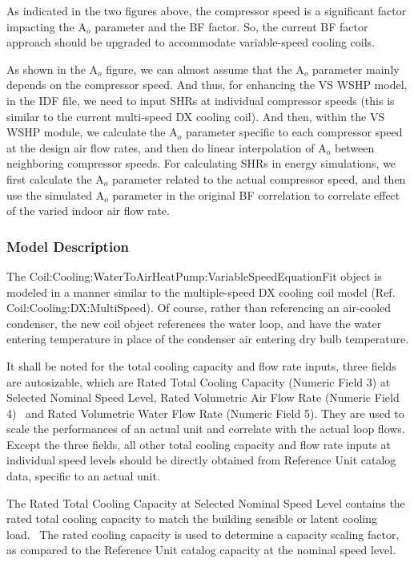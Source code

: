 As indicated in the two figures above, the compressor speed is a significant factor impacting the A\(_{o}\) parameter and the BF factor. So, the current BF factor approach should be upgraded to accommodate variable-speed cooling coils.

As shown in the A\(_{o}\) figure, we can almost assume that the A\(_{o}\) parameter mainly depends on the compressor speed. And thus, for enhancing the VS WSHP model, in the IDF file, we need to input SHRs at individual compressor speeds (this is similar to the current multi-speed DX cooling coil). And then, within the VS WSHP module, we calculate the A\(_{o}\) parameter specific to each compressor speed at the design air flow rates, and then do linear interpolation of A\(_{o}\) between neighboring compressor speeds. For calculating SHRs in energy simulations, we first calculate the A\(_{o}\) parameter related to the actual compressor speed, and then use the simulated A\(_{o}\) parameter in the original BF correlation to correlate effect of the varied indoor air flow rate.

\subsubsection{Model Description}\label{model-description-11}

The Coil:Cooling:WaterToAirHeatPump:VariableSpeedEquationFit object is modeled in a manner similar to the multiple-speed DX cooling coil model (Ref. Coil:Cooling:DX:MultiSpeed). Of course, rather than referencing an air-cooled condenser, the new coil object references the water loop, and have the water entering temperature in place of the condenser air entering dry bulb temperature.

It shall be noted for the total cooling capacity and flow rate inputs, three fields are autosizable, which are Rated Total Cooling Capacity (Numeric Field 3) at Selected Nominal Speed Level, Rated Volumetric Air Flow Rate (Numeric Field 4) ~and Rated Volumetric Water Flow Rate (Numeric Field 5). They are used to scale the performances of an actual unit and correlate with the actual loop flows. Except the three fields, all other total cooling capacity and flow rate inputs at individual speed levels should be directly obtained from Reference Unit catalog data, specific to an actual unit.

The Rated Total Cooling Capacity at Selected Nominal Speed Level contains the rated total cooling capacity to match the building sensible or latent cooling load.~ The rated cooling capacity is used to determine a capacity scaling factor, as compared to the Reference Unit catalog capacity at the nominal speed level.

